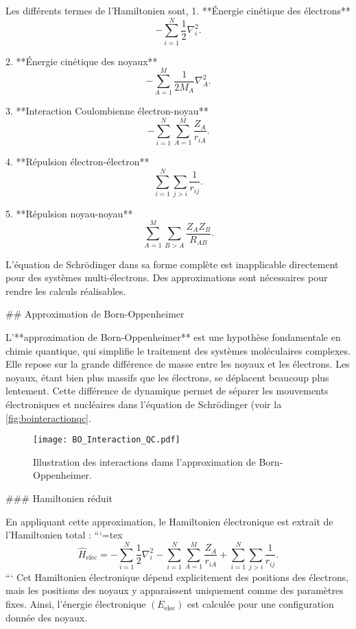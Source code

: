\documentclass[12pt,a4paper]{report}
\begin{document}
\begin{markdown}
Les différents termes de l'Hamiltonien sont,
1. **Énergie cinétique des électrons**
   \begin{equation}
   -\sum_{i=1}^N \frac12 \nabla_i^2.
   \end{equation}

2. **Énergie cinétique des noyaux**
   \begin{equation}
   -\sum_{A=1}^M \frac{1}{2M_A} \nabla_A^2 .
   \end{equation}

3. **Interaction Coulombienne électron-noyau**
   \begin{equation}
   -\sum_{i=1}^N \sum_{A=1}^M \frac{Z_A}{r_{iA}} .
   \end{equation}

4. **Répulsion électron-électron**
   \begin{equation}
   \sum_{i=1}^N \sum_{j>i} \frac{1}{r_{ij}} .
   \end{equation}

5. **Répulsion noyau-noyau**
   \begin{equation}
   \sum_{A=1}^M \sum_{B>A} \frac{Z_A Z_B}{R_{AB}} .
   \end{equation}

L'équation de Schrödinger dans sa forme complète est inapplicable directement pour des systèmes multi-électrons. Des approximations sont nécessaires pour rendre les calculs réalisables.


## Approximation de Born-Oppenheimer

L'**approximation de Born-Oppenheimer** est une hypothèse fondamentale en chimie quantique, qui simplifie le traitement des systèmes moléculaires complexes. Elle repose sur la grande différence de masse entre les noyaux et les électrons. Les noyaux, étant bien plus massifs que les électrons, se déplacent beaucoup plus lentement. Cette différence de dynamique permet de séparer les mouvements électroniques et nucléaires dans l’équation de Schrödinger (voir la \autoref{fig:bointeractionqc}.

\begin{figure}[tbph]
\centering
\texttt{[image: BO\_Interaction\_QC.pdf]}
\caption{Illustration des interactions dams l'approximation de Born-Oppenheimer.}
\label{fig:bointeractionqc}
\end{figure}

### Hamiltonien réduit

En appliquant cette approximation, le Hamiltonien électronique est extrait de l'Hamiltonien total :
```{=tex}
\begin{equation}
\hat{H}_{\text{elec}} = -\sum_{i=1}^N \frac12 \nabla_i^2 - \sum_{i=1}^N \sum_{A=1}^M \frac{Z_A}{r_{iA}} + \sum_{i=1}^N \sum_{j>i} \frac{1}{r_{ij}} .
\end{equation}
```
Cet Hamiltonien électronique dépend explicitement des positions des électrons, mais les positions des noyaux y apparaissent uniquement comme des paramètres fixes. Ainsi, l'énergie électronique $(E_{\text{elec}})$ est calculée pour une configuration donnée des noyaux.


\end{markdown}
\end{document}
